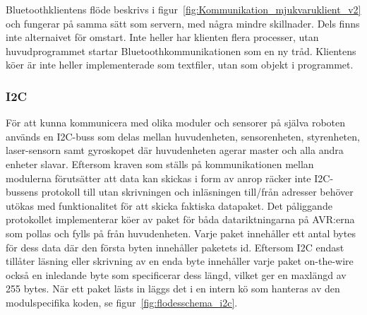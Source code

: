 \documentclass{article}
\begin{document}
Bluetoothklientens flöde beskrivs i figur~\ref{fig:Kommunikation_mjukvaruklient_v2} och fungerar på samma sätt som servern, med några mindre skillnader. Dels finns inte alternaivet för omstart. Inte heller har klienten flera processer, utan huvudprogrammet startar Bluetoothkommunikationen som en ny tråd. Klientens köer är inte heller implementerade som textfiler, utan som objekt i programmet.


\subsubsection{I2C}
\label{sec:i2c}
För att kunna kommunicera med olika moduler och sensorer på själva roboten används en I2C-buss som delas mellan huvudenheten, sensorenheten, styrenheten, laser-sensorn samt gyroskopet där huvudenheten agerar master och alla andra enheter slavar. Eftersom kraven som ställs på kommunikationen mellan modulerna förutsätter att data kan skickas i form av anrop räcker inte I2C-bussens protokoll till utan skrivningen och inläsningen till/från adresser behöver utökas med funktionalitet för att skicka faktiska datapaket. Det påliggande protokollet implementerar köer av paket för båda datariktningarna på AVR:erna som pollas och fylls på från huvudenheten. Varje paket innehåller ett antal bytes för dess data där den första byten innehåller paketets id. Eftersom I2C endast tillåter läsning eller skrivning av en enda byte innehåller varje paket on-the-wire också en inledande byte som specificerar dess längd, vilket ger en maxlängd av 255 bytes. När ett paket lästs in läggs det i en intern kö som hanteras av den modulspecifika koden, se figur~\ref{fig:flodesschema_i2c}.
\end{document}
